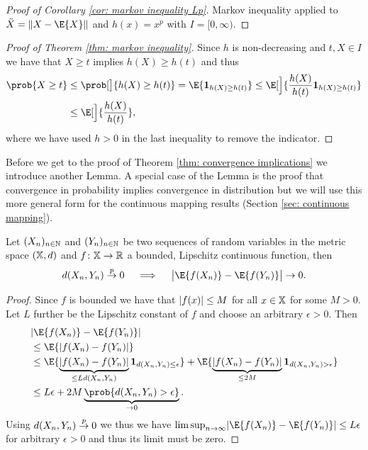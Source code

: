 \begin{proof}[Proof of Corollary \ref{cor: markov inequality Lp}]
    Markov inequality applied to \(\tilde X = \norm{X - \E{X}}\) 
    and \(h(x) = x^p\) with \(I = [0, \infty)\).
\end{proof}

\begin{proof}[Proof of Theorem \ref{thm: markov inequality}]
    Since \(h\) is non-decreasing and \(t, X \in I\)
    we have that \(X \ge t\) implies \(h(X) \ge h(t)\)
    and thus
    \[\begin{aligned}
        \prob{X \ge t}
        &\le \prob[\big]{h(X) \ge h(t)}
        = \E{\ind{h(X) \ge h(t)}}
        \le \E[\Big]{\frac{h(X)}{h(t)}\ind{h(X) \ge h(t)}}
        \\
        &\le \E[\Big]{\frac{h(X)}{h(t)}},
    \end{aligned}
    \]
    where we have used \(h > 0\) in the last inequality to remove the indicator.
\end{proof}

Before we get to the proof of Theorem \ref{thm: convergence implications}
we introduce another Lemma. A special case of the Lemma is the proof that
convergence in probability implies convergence in distribution but we will use
this more general form for the continuous mapping results (Section \ref{sec:
continuous mapping}).

\begin{lemma}\label{lem: moving target p to d}
    Let \((X_n)_{n\in \mathbb{N}}\) and \((Y_n)_{n\in \mathbb{N}}\) be two sequences of
    random variables in the metric space \((\mathbb{X}, d)\) and
    \(f\colon \mathbb{X} \to \mathbb{R}\) a bounded, Lipschitz continuous function, then
    \[
        \metric(X_n,Y_n) \overset{p}\to 0
        \quad\implies\quad
        \abs[\big]{\E{f(X_n)} - \E{f(Y_n)}} \to 0.
    \]
\end{lemma}

\begin{proof}
    Since \(f\) is bounded we have that \(\lvert f(x)\rvert \le M\) for all \(x\in
    \mathbb{X}\) for some \(M > 0\). Let \(L\) further be the Lipschitz constant
    of \(f\) and choose an arbitrary \(\epsilon > 0\).
    Then
    \[\begin{aligned}
        &\abs{\E{f(X_n)} - \E{f(Y_n)}}
        \\
        &\le \E{\abs{f(X_n) - f(Y_n)}}
        \\
        &\le \E{\underbrace{\abs{f(X_n) - f(Y_n)}}_{\le L\metric(X_n, Y_n)} \ind{\metric(X_n, Y_n) \le \epsilon}}
        + \E{\underbrace{\abs{f(X_n) - f(Y_n)}}_{\le 2M} \ind{\metric(X_n, Y_n) > \epsilon}}
        \\
        &\le L \epsilon + 2M \underbrace{\prob{\metric(X_n, Y_n) > \epsilon}}_{\to 0}.
    \end{aligned}\]
    Using \(d(X_n, Y_n) \overset{p}\to 0\) we thus we have \(\limsup_{n\to
    \infty} \abs{\E{f(X_n)} - \E{f(Y_n)}} \le L \epsilon\)
    for arbitrary \(\epsilon > 0\) and thus its limit must be zero.
\end{proof}

